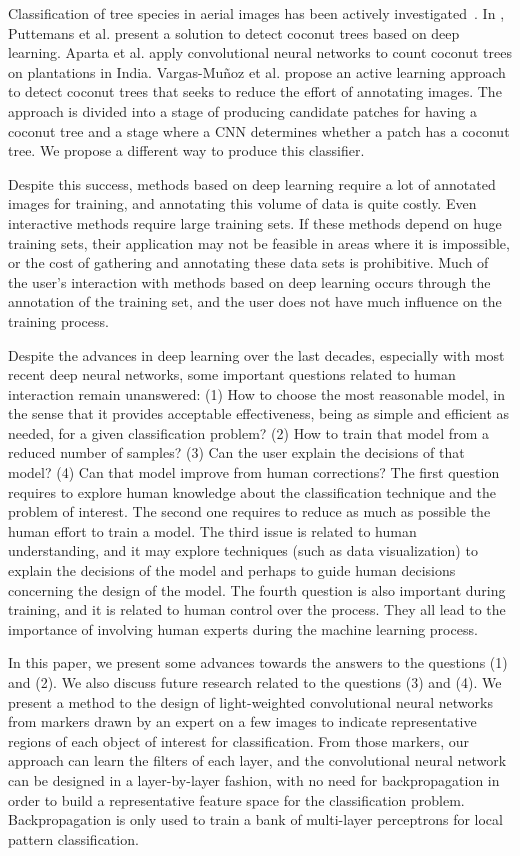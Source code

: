 \documentclass[a4paper,conference]{IEEEtran}
\begin{document}
Classification of tree species in aerial images has been actively investigated~\cite{fassnacht2016review}. In \cite{puttemans2018comparing}, Puttemans et al. present a solution to detect coconut trees based on deep learning. Aparta et al. \cite{aparna2018cnn} apply convolutional neural networks to count coconut trees on plantations in India. Vargas-Muñoz et al. \cite{8899005} propose an active learning approach to detect coconut trees that seeks to reduce the effort of annotating images. The \cite{8899005} approach is divided into a stage of producing candidate patches for having a coconut tree and a stage where a CNN determines whether a patch has a coconut tree. We propose a different way to produce this classifier.  

Despite this success, methods based on deep learning require a lot of annotated images for training, and annotating this volume of data is quite costly. Even interactive methods require large training sets. If these methods depend on huge training sets, their application may not be feasible in areas where it is impossible, or the cost of gathering and annotating these data sets is prohibitive. Much of the user's interaction with methods based on deep learning occurs through the annotation of the training set, and the user does not have much influence on the training process.

Despite the advances in deep learning over the last decades, especially with most recent deep neural networks, some important questions related to human interaction remain unanswered: (1) How to choose the most reasonable model, in the sense that it provides acceptable effectiveness, being as simple and efficient as needed, for a given classification problem? (2) How to train that model from a reduced number of samples?  (3) Can the user explain the decisions of that model? (4) Can that model improve from human corrections? The first question requires to explore human knowledge about the classification technique and the problem of interest. The second one requires to reduce as much as possible the human effort to train a model. The third issue is related to human understanding, and it may explore techniques (such as data visualization) to explain the decisions of the model and perhaps to guide human decisions concerning the design of the model. The fourth question is also important during training, and it is related to human control over the process. They all lead to the importance of involving human experts during the machine learning process.

In this paper, we present some advances towards the answers to the questions (1) and (2). We also discuss future research related to the questions (3) and (4). We present a method to the design of light-weighted convolutional neural networks from markers drawn by an expert on a few images to indicate representative regions of each object of interest for classification. From those markers, our approach can learn the filters of each layer, and the convolutional neural network can be designed in a layer-by-layer fashion, with no need for backpropagation in order to build a representative feature space for the classification problem. Backpropagation is only used to train a bank of multi-layer perceptrons for local pattern classification.
\end{document}
